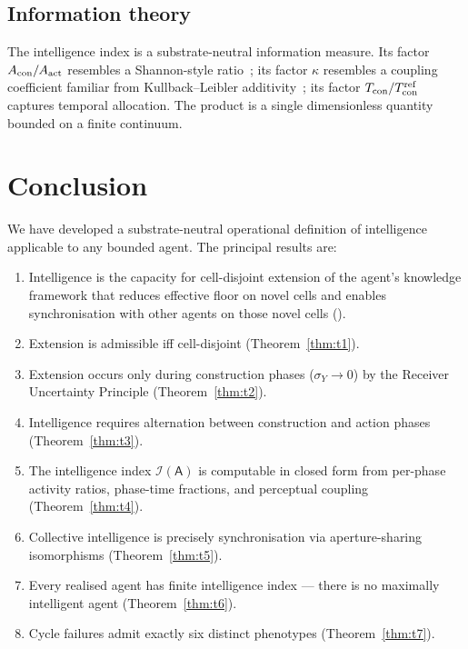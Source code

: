 \documentclass[11pt,twocolumn,a4paper]{article}
\newcommand{\agent}{\mathsf{A}}
\newcommand{\Iindex}{\mathcal{I}}
\newcommand{\Acon}{A_{\rm con}}
\newcommand{\Aact}{A_{\rm act}}
\newcommand{\Tcon}{T_{\rm con}}
\begin{document}
\subsection{Information theory}

The intelligence index is a substrate-neutral information measure. Its factor
$\Acon / \Aact$ resembles a Shannon-style ratio~\cite{shannon1948,coverthomas2006}; its
factor $\kappa$ resembles a coupling coefficient familiar from
Kullback--Leibler additivity~\cite{kullback1951}; its factor $\Tcon / \Tcon^{\rm ref}$
captures temporal allocation. The product is a single dimensionless quantity bounded
on a finite continuum.

\section{Conclusion}
\label{sec:conclusion}

We have developed a substrate-neutral operational definition of intelligence applicable
to any bounded agent. The principal results are:

\begin{enumerate}[label=(\arabic*),leftmargin=*]
\item Intelligence is the capacity for cell-disjoint extension of the agent's knowledge
framework that reduces effective floor on novel cells and enables synchronisation with
other agents on those novel cells ().
\item Extension is admissible iff cell-disjoint (Theorem~\ref{thm:t1}).
\item Extension occurs only during construction phases ($\sigma_Y \to 0$) by the Receiver
Uncertainty Principle (Theorem~\ref{thm:t2}).
\item Intelligence requires alternation between construction and action phases
(Theorem~\ref{thm:t3}).
\item The intelligence index $\Iindex(\agent)$ is computable in closed form from
per-phase activity ratios, phase-time fractions, and perceptual coupling
(Theorem~\ref{thm:t4}).
\item Collective intelligence is precisely synchronisation via aperture-sharing
isomorphisms (Theorem~\ref{thm:t5}).
\item Every realised agent has finite intelligence index --- there is no maximally
intelligent agent (Theorem~\ref{thm:t6}).
\item Cycle failures admit exactly six distinct phenotypes
(Theorem~\ref{thm:t7}).
\end{enumerate}
\end{document}

